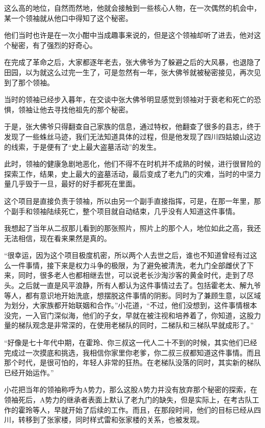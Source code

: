 这么高的地位，自然而然地，他就会接触到一些核心人物，在一次偶然的机会中，某一个领袖就从他口中得知了这个秘密。

他们当时也许是在一次小酣中当成趣事来说的，但是这个领袖却听了进去，他对这个秘密，有了强烈的好奇心。

在完成了革命之后，大家都逐年老去，张大佛爷为了躲避之后的大风暴，也退隐了田园，以为就这么过完一生了，可是忽然有一年，张大佛爷就被秘密接见，再次见到了那个领袖。

当时的领袖已经步入暮年，在交谈中张大佛爷明显感觉到领袖对于衰老和死亡的恐惧，领袖让他去寻找他祖先的那个秘密。

于是，张大佛爷只得翻查自己家族的信息，通过特权，他翻查了很多的县志，终于发现了一些蛛丝马迹，我们无法知道具体的过程，但是他发现了四川四姑娘山这边的线索，于是便有了“史上最大盗墓活动”的发生。

此时，领袖的健康急剧地恶化，他们不得不在时机并不成熟的时候，进行很冒险的探索工作，结果，史上最大的盗墓活动，最后变成了老九门的灾难，当时的中坚力量几乎毁于一旦，最好的好手都死在里面。

这个项目是直接负责于领袖，所以由另一个副手直接指挥，可是，在那一年里，那个副手和领袖陆续死亡，整个项目就自动结束，几乎没有人知道这件事情。

我想起了当年从二叔那儿看到的那张照片，照片上的那个人，地位如此之高，我还无法相信，现在看来果然是真的。

“很幸运，因为这个项目极度机密，所以两个人去世之后，谁也不知道曾经有过这么一件事情，接下来是权力斗争的极限，为了避免被清洗，老九门全部雌伏了下来，同时，很多老人也都相继去世，可以说老长沙淘沙客的黄金时代，走到了尽头。之后就一直是风平浪静，所有人都认为这件事情过去了。包括霍老太、解九爷等人，都有意识地开始洗底，想摆脱这件事情的阴影。同时为了兼顾生意，以区域为划分，大家族都开始联姻和合作。”小花道，“不过，他们没想到，这件事情根本没完，一入官门深似海，他们的子女，早就在被注视和培养着了，你知道，这股力量的梯队观念是非常深的，在使用老梯队的同时，二梯队和三梯队早就成形了。”

“好像是七十年代中期，在霍玲、你三叔这一代人二十不到的时候，其实他们已经完成过一次摸底和挑选，我相信你家里你老爹，你二叔三叔都知道这件事情。而且那个时代，是很可怕的，年轻人非常的狂热。在老梯队没落的同时，其实新的梯队已经开始运作。”

小花把当年的领袖称呼为A势力，那么这股A势力并没有放弃那个秘密的探索，在领袖死后，A势力的继承者表面上默认了老九门的缺失，但是实际上，在考古队工作的霍玲等人，早就开始了后续的工作。而且，在那段时间，他们的目标已经从四川，转移到了张家楼，同时样式雷和张家楼的关系，也被发现。

